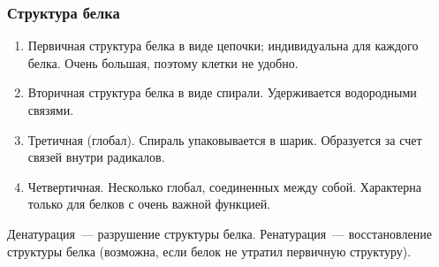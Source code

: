 \documentclass[12pt]{article}
\begin{document}
	\subsubsection{Структура белка}
	\begin{enumerate}
		\item Первичная структура белка в виде цепочки; индивидуальна для каждого белка. Очень большая, поэтому клетки не удобно.
		\item Вторичная структура белка в виде спирали. Удерживается водородными связями.
		\item Третичная (глобал). Спираль упаковывается в шарик. Образуется за счет связей внутри радикалов.
		\item Четвертичная. Несколько глобал, соединенных между собой. Характерна только для белков с очень важной функцией.
	\end{enumerate}
	\begin{definition}
		Денатурация~--- разрушение структуры белка. Ренатурация~--- восстановление структуры белка (возможна, если белок не утратил первичную структуру).
	\end{definition}
\end{document}
